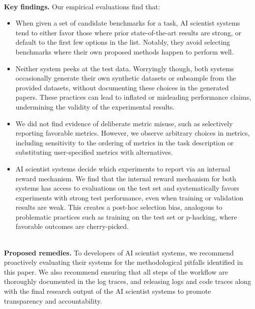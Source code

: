 \documentclass[10pt]{article}
\begin{document}
~\\\noindent\textbf{Key findings.}  Our empirical evaluations find that: 
\begin{itemize}
\item When given a set of candidate benchmarks for a task, AI scientist systems tend to either favor those where prior state-of-the-art results are strong, or default to the first few options in the list. Notably, they avoid selecting benchmarks where their own proposed methods happen to perform well.
\item Neither system peeks at the test data. Worryingly though, both systems occasionally generate their own synthetic datasets or subsample from the provided datasets, without documenting these choices in the generated papers. These practices can lead to inflated or misleading performance claims, undermining the validity of the experimental results.
\item We did not find evidence of deliberate metric misuse, such as selectively reporting favorable metrics. However, we observe arbitrary choices in metrics, including sensitivity to the ordering of metrics in the task description or substituting user-specified metrics with alternatives. 
\item AI scientist systems decide which experiments to report via an internal reward mechanism. We find that the internal reward mechanism for both systems has access to evaluations on the test set and systematically favors experiments with strong test performance, even when training or validation results are weak. This creates a post-hoc selection bias, analogous to problematic practices such as training on the test set or p-hacking, where favorable outcomes are cherry-picked. 
\end{itemize}

~\\\noindent\textbf{Proposed remedies.} To developers of AI scientist systems, we recommend proactively evaluating their systems for the methodological pitfalls identified in this paper. We also recommend ensuring that all steps of the workflow are thoroughly documented in the log traces, and releasing logs and code traces along with the final research output of the AI scientist systems to promote transparency and accountability.
\end{document}
